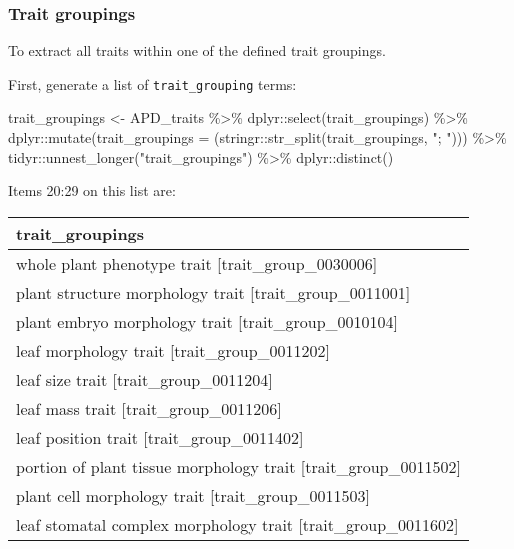\documentclass[
  letterpaper,
  DIV=11,
  numbers=noendperiod]{scrartcl}
\newenvironment{Shaded}{\begin{snugshade}}{\end{snugshade}}
\newcommand{\AttributeTok}[1]{\textcolor[rgb]{0.40,0.45,0.13}{#1}}
\newcommand{\FunctionTok}[1]{\textcolor[rgb]{0.28,0.35,0.67}{#1}}
\newcommand{\NormalTok}[1]{\textcolor[rgb]{0.00,0.23,0.31}{#1}}
\newcommand{\OtherTok}[1]{\textcolor[rgb]{0.00,0.23,0.31}{#1}}
\newcommand{\SpecialCharTok}[1]{\textcolor[rgb]{0.37,0.37,0.37}{#1}}
\newcommand{\StringTok}[1]{\textcolor[rgb]{0.13,0.47,0.30}{#1}}
\begin{document}
\pagebreak

\hypertarget{trait-groupings}{%
\subsubsection{Trait groupings}\label{trait-groupings}}

To extract all traits within one of the defined trait groupings.

First, generate a list of \texttt{trait\_grouping} terms:

\begin{Shaded}
\begin{Highlighting}[]
\NormalTok{trait\_groupings }\OtherTok{\textless{}{-}} 
\NormalTok{  APD\_traits }\SpecialCharTok{\%\textgreater{}\%}
\NormalTok{  dplyr}\SpecialCharTok{::}\FunctionTok{select}\NormalTok{(trait\_groupings) }\SpecialCharTok{\%\textgreater{}\%}
\NormalTok{  dplyr}\SpecialCharTok{::}\FunctionTok{mutate}\NormalTok{(}\AttributeTok{trait\_groupings =}\NormalTok{ (stringr}\SpecialCharTok{::}\FunctionTok{str\_split}\NormalTok{(trait\_groupings, }\StringTok{"; "}\NormalTok{))) }\SpecialCharTok{\%\textgreater{}\%}
\NormalTok{  tidyr}\SpecialCharTok{::}\FunctionTok{unnest\_longer}\NormalTok{(}\StringTok{"trait\_groupings"}\NormalTok{) }\SpecialCharTok{\%\textgreater{}\%}
\NormalTok{  dplyr}\SpecialCharTok{::}\FunctionTok{distinct}\NormalTok{()}
\end{Highlighting}
\end{Shaded}

Items 20:29 on this list are:

\begin{tabular}{l}
\toprule
trait\_groupings\\
\midrule
whole plant phenotype trait [trait\_group\_0030006]\\
plant structure morphology trait [trait\_group\_0011001]\\
plant embryo morphology trait [trait\_group\_0010104]\\
leaf morphology trait [trait\_group\_0011202]\\
leaf size trait [trait\_group\_0011204]\\
\addlinespace
leaf mass trait [trait\_group\_0011206]\\
leaf position trait [trait\_group\_0011402]\\
portion of plant tissue morphology trait [trait\_group\_0011502]\\
plant cell morphology trait [trait\_group\_0011503]\\
leaf stomatal complex morphology trait [trait\_group\_0011602]\\
\bottomrule
\end{tabular}
\end{document}
